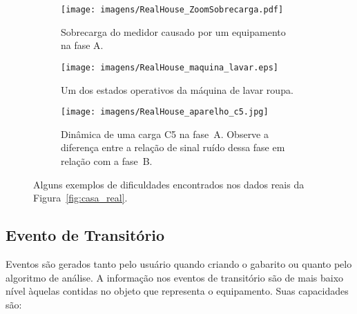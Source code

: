 \begin{figure*}[p!]
  \begin{center}
    \begin{subfigure}[c]{\textwidth}
      \texttt{[image: imagens/RealHouse\_ZoomSobrecarga.pdf]}
      \caption{Sobrecarga do medidor causado por um equipamento na
        fase A.}
      \label{fig:sobrecarga}
    \end{subfigure}
    \hfill
    \begin{subfigure}[c]{\textwidth}
      \texttt{[image: imagens/RealHouse\_maquina\_lavar.eps]}
      \caption{Um dos estados operativos da máquina de lavar
        roupa.}
      \label{fig:maquina_lavar}
    \end{subfigure}
    \hfill
    \begin{subfigure}[c]{\textwidth}
      \texttt{[image: imagens/RealHouse\_aparelho\_c5.jpg]}
      \caption{Dinâmica de uma carga C5 na fase~A. Observe a diferença
entre a relação de sinal ruído dessa fase em relação com a fase~B.}
      \label{fig:c5_ruido}
    \end{subfigure}
  \end{center}
\caption[Alguns exemplos de dificuldades encontrados nos dados reais]{
Alguns exemplos de dificuldades encontrados nos dados reais da
Figura~\ref{fig:casa_real}.}
\label{fig:dificuldades}
\end{figure*}

%


\subsection{Evento de Transitório}
\label{ssec:evento}

Eventos são gerados tanto pelo usuário quando criando o gabarito ou
quanto pelo algoritmo de análise. A informação nos eventos de
transitório são de mais baixo nível àquelas contidas no objeto que
representa o equipamento. Suas capacidades são:

